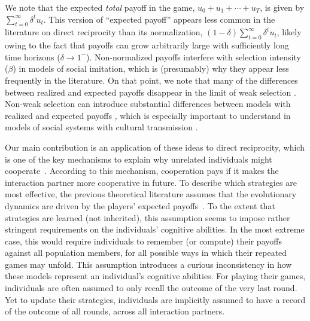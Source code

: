 \documentclass[11pt]{article}
\theoremstyle{plainCl1}
\theoremstyle{plainCl2}
\begin{document}
We note that the expected \emph{total} payoff in the game, $u_{0}+u_{1}+\cdots +u_{T}$, is given by $\sum_{t=0}^{\infty}\delta^{t}u_{t}$. This version of ``expected payoff'' appears less common in the literature on direct reciprocity than its normalization, $\left(1-\delta\right)\sum_{t=0}^{\infty}\delta^{t}u_{t}$, likely owing to the fact that payoffs can grow arbitrarily large with sufficiently long time horizons ($\delta\rightarrow 1^{-}$). Non-normalized payoffs interfere with selection intensity ($\beta$) in models of social imitation, which is (presumably) why they appear less frequently in the literature. On that point, we note that many of the differences between realized and expected payoffs disappear in the limit of weak selection \citep{mcavoy:NHB:2020}. Non-weak selection can introduce substantial differences between models with realized and expected payoffs \citep{mcavoy:PLOSCB:2021}, which is especially important to understand in models of social systems with cultural transmission \citep{cavalli1981cultural}.

Our main contribution is an application of these ideas to direct reciprocity, which is one of the key mechanisms to explain why unrelated individuals might cooperate~\citep{nowak:Science:2006}. 
According to this mechanism, cooperation pays if it makes the interaction partner more cooperative in future. 
To describe which strategies are most effective, the previous theoretical literature assumes that the evolutionary dynamics are driven by the players' expected payoffs~\citep{brauchli:JTB:1999,brandt:JTB:2006,ohtsuki:JTB:2007b,szolnoki:pre:2009b,imhof2010stochastic,van-segbroeck:prl:2012,grujic:jtb:2012,Martinez2012,stewart:pnas:2013,pinheiro:PLoSCB:2014,stewart:games:2015,Baek2016,McAvoy:ProcA:2019,glynatsi:SCR:2020,Schmid:PlosCB:2022,Murase:SciRep:2022}.
To the extent that strategies are learned (not inherited), this assumption seems to impose rather stringent requirements on the individuals' cognitive abilities. 
In the most extreme case, this would require individuals to remember (or compute) their payoffs against all population members, for all possible ways in which their repeated games may unfold. 
This assumption introduces a curious inconsistency in how these models represent an individual's cognitive abilities. 
For playing their games, individuals are often assumed to only recall the outcome of the very last round. 
Yet to update their strategies, individuals are implicitly assumed to have a record of the outcome of all rounds, across all interaction partners. 
\end{document}
